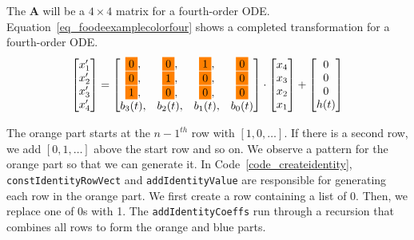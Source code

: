 The \textbf{A} will be a $4 \times 4$ matrix for a fourth-order ODE. Equation~\ref{eq_foodeexamplecolorfour} shows a completed transformation for a fourth-order ODE.
\begin{equation} \label{eq_foodeexamplecolorfour}
	\begin{bmatrix}
		{x_{1}'} \\
    {x_{2}'} \\
    {x_{3}'} \\
    {x_{4}'}
	\end{bmatrix}
    = 
  \begin{bmatrix}
		\highlight{orange}{0}, & \highlight{orange}{0}, & \highlight{orange}{1}, & \highlight{orange}{0} \\
    \highlight{orange}{0}, & \highlight{orange}{1}, & \highlight{orange}{0}, & \highlight{orange}{0} \\
    \highlight{orange}{1}, & \highlight{orange}{0}, & \highlight{orange}{0}, & \highlight{orange}{0} \\
    {b_{3}(t)}, & {b_{2}(t)}, & {b_{1}(t)}, & {b_{0}(t)}
	\end{bmatrix}
    \cdot
  \begin{bmatrix}
		{x_{4}} \\
    {x_{3}} \\
    {x_{2}} \\
    {x_{1}}
	\end{bmatrix}
    + 
  \begin{bmatrix}
    {0} \\
    {0} \\
    {0} \\
    {h(t)}
	\end{bmatrix}
\end{equation}

The orange part starts at the ${n-1}^{th}$ row with $[1, 0, \dots]$. If there is a second row, we add $[0, 1, \dots]$ above the start row and so on. We observe a pattern for the orange part so that we can generate it. In Code~\ref{code_createidentity}, \verb|constIdentityRowVect| and \verb|addIdentityValue| are responsible for generating each row in the orange part. We first create a row containing a list of 0. Then, we replace one of 0s with 1. The \verb|addIdentityCoeffs| run through a recursion that combines all rows to form the orange and blue parts.

